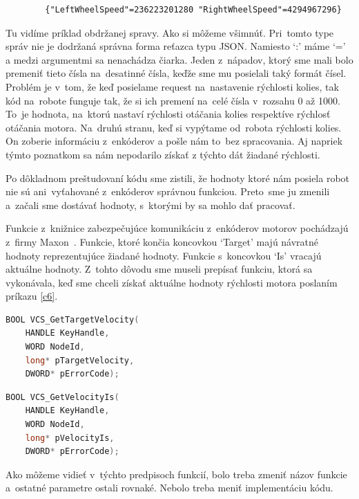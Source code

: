 \label{jsonWannabeSpeed}
\begin{lstlisting}
		{"LeftWheelSpeed"=236223201280 "RightWheelSpeed"=4294967296}
\end{lstlisting}

Tu vidíme príklad obdržanej spravy. Ako si môžeme všimnúť. Pri~tomto type správ nie je dodržaná správna forma reťazca typu JSON. Namiesto `:'
máme `=' a medzi argumentmi sa nenachádza čiarka. Jeden z~nápadov, ktorý sme mali bolo premeniť tieto čísla na~desatinné čísla, keďže sme mu
posielali taký formát čísel. Problém je v~tom, že keď posielame request na~nastavenie rýchlosti kolies, tak kód na~robote funguje tak, že si
ich premení na~celé čísla v~rozsahu 0 až 1000. To~je hodnota, na~ktorú nastaví rýchlosti otáčania kolies respektíve rýchlosť otáčania motora.
Na~druhú stranu, keď si vypýtame od~robota rýchlosti kolies. On zoberie informáciu z~enkóderov a pošle nám to~bez spracovania. Aj napriek týmto
poznatkom sa nám nepodarilo získať z týchto dát žiadané rýchlosti.

Po dôkladnom preštudovaní kódu sme zistili, že hodnoty ktoré nám posiela robot nie sú ani~vyťahované z~enkóderov správnou funkciou. Preto~sme ju
zmenili a~začali sme dostávať hodnoty, s~ktorými by sa mohlo dať pracovať.

Funkcie z~knižnice zabezpečujúce komunikáciu z~enkóderov motorov pochádzajú z~firmy Maxon~\cite{EPOSdoc}. Funkcie, ktoré končia koncovkou `Target'
majú návratné hodnoty reprezentujúce žiadané hodnoty. Funkcie s~koncovkou `Is' vracajú aktuálne hodnoty. Z~tohto dôvodu sme museli prepísať
funkciu, ktorá sa vykonávala, keď sme chceli získať aktuálne hodnoty rýchlosti motora poslaním príkazu \ref{c6}.


\label{VelocityIs}
\begin{lstlisting}[language=C++]
BOOL VCS_GetTargetVelocity(
	HANDLE KeyHandle,
	WORD NodeId,
	long* pTargetVelocity,
	DWORD* pErrorCode);
\end{lstlisting}

\begin{lstlisting}[language=C++]
BOOL VCS_GetVelocityIs(
	HANDLE KeyHandle,
	WORD NodeId,
	long* pVelocityIs,
	DWORD* pErrorCode);
\end{lstlisting}

\noindent Ako môžeme vidieť v~týchto predpisoch funkcií, bolo treba zmeniť názov funkcie a~ostatné parametre ostali rovnaké.
Nebolo treba meniť implementáciu kódu.

